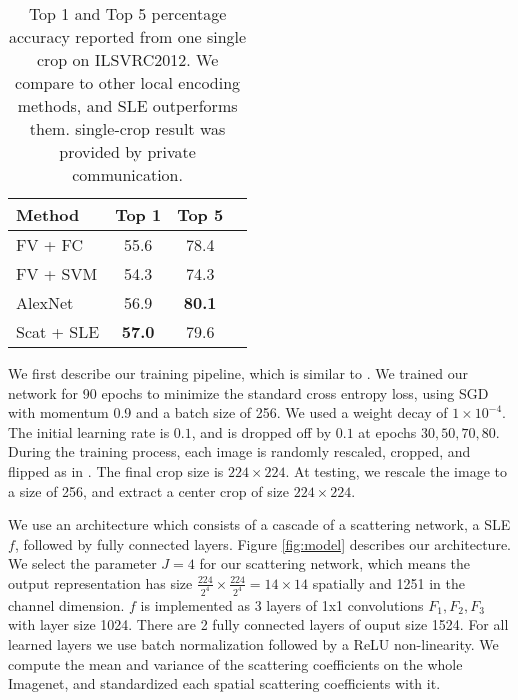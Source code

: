 \documentclass[10pt,twocolumn,letterpaper]{article}
\newcommand{\citep}{\cite}
\begin{document}
\begin{table}
\begin{center}
\begin{tabular}{|l|c|c|c|}
\hline
\bf Method  &\bf Top 1 &\bf Top 5  \\
\hline







FV + FC    \cite{perronnin2015fisher} &55.6  & 78.4 \\FV + SVM   \cite{sanchez2011high}          & 54.3 & 74.3\\AlexNet  & 56.9 &\bf 80.1\\Scat + SLE  & \bf 57.0&79.6\\\hline
\end{tabular}
\end{center}
\label{res_1x1}
\caption{Top 1 and Top 5 percentage accuracy reported from one single crop on ILSVRC2012. We compare to other local encoding methods, and SLE outperforms them.  \cite{perronnin2015fisher} single-crop result was provided by private communication.}
\end{table}

We first describe our training pipeline, which is similar to \cite{zagoruyko2016wide}. We trained our network for 90 epochs to minimize the standard cross entropy loss, using SGD with momentum 0.9 and a batch size of 256. We used a weight decay of $1\times10^{-4}$. The initial learning rate is $0.1$, and is dropped off by $0.1$ at epochs $30,50,70,80$. During the training process, each image is randomly rescaled, cropped, and flipped as in \citep{he2015deep}. The final crop size is $224\times 224$. At testing, we rescale the image to a size of 256, and extract a center crop of size $224\times 224$. 

We use an architecture which consists of a cascade of a scattering network, a SLE $f$, followed by fully connected layers. Figure \ref{fig:model} describes our architecture. We select the parameter $J=4$ for our scattering network, which means the output representation has size $\frac{224}{2^4}\times\frac{224}{2^4}=14\times 14$ spatially and 1251 in the channel dimension. $f$ is implemented as 3 layers of 1x1 convolutions $F_1,F_2,F_3$ with layer size 1024. There are 2 fully connected layers of ouput size 1524. For all learned layers we use batch normalization \cite{ioffe2015batch} followed by a ReLU \cite{krizhevsky2012imagenet} non-linearity. We compute the mean and variance of the scattering coefficients on the whole Imagenet, and standardized each spatial scattering coefficients with it.
\end{document}
